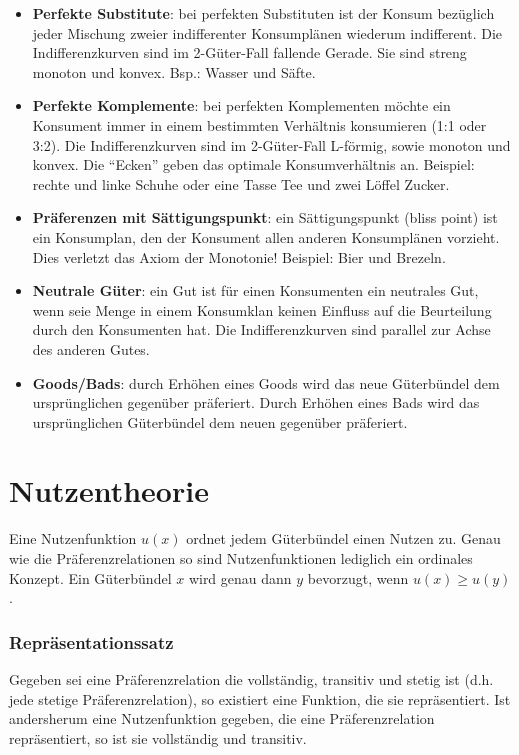 \begin{itemize}
	\item \textbf{Perfekte Substitute}: bei perfekten Substituten ist der Konsum bezüglich jeder Mischung zweier indifferenter Konsumplänen wiederum indifferent. Die Indifferenzkurven sind im 2-Güter-Fall fallende Gerade. Sie sind streng monoton und konvex. Bsp.: Wasser und Säfte.
	\item \textbf{Perfekte Komplemente}: bei perfekten Komplementen möchte ein Konsument immer in einem bestimmten Verhältnis konsumieren (1:1 oder 3:2). Die Indifferenzkurven sind im 2-Güter-Fall L-förmig, sowie monoton und konvex. Die \enquote{Ecken} geben das optimale Konsumverhältnis an. Beispiel: rechte und linke Schuhe oder eine Tasse Tee und zwei Löffel Zucker.
	\item \textbf{Präferenzen mit Sättigungspunkt}: ein Sättigungspunkt (bliss point) ist ein Konsumplan, den der Konsument allen anderen Konsumplänen vorzieht. Dies verletzt das Axiom der Monotonie! Beispiel: Bier und Brezeln.
	\item \textbf{Neutrale Güter}: ein Gut ist für einen Konsumenten ein neutrales Gut, wenn seie Menge in einem Konsumklan keinen Einfluss auf die Beurteilung durch den Konsumenten hat. Die Indifferenzkurven sind parallel zur Achse des anderen Gutes.
	\item \textbf{Goods/Bads}: durch Erhöhen eines Goods wird das neue Güterbündel dem ursprünglichen gegenüber präferiert. Durch Erhöhen eines Bads wird das ursprünglichen Güterbündel dem neuen gegenüber präferiert. 
\end{itemize}

\section{Nutzentheorie}

Eine Nutzenfunktion $u(x)$ ordnet jedem Güterbündel einen Nutzen zu. Genau wie die Präferenzrelationen so sind Nutzenfunktionen lediglich ein ordinales Konzept. Ein Güterbündel $x$ wird genau dann $y$ bevorzugt, wenn $u(x) \geq u(y)$.

\subsubsection*{Repräsentationssatz}

Gegeben sei eine Präferenzrelation die vollständig, transitiv und stetig ist (d.h. jede stetige Präferenzrelation), so existiert eine Funktion, die sie repräsentiert. Ist andersherum eine Nutzenfunktion gegeben, die eine Präferenzrelation repräsentiert, so ist sie vollständig und transitiv.

